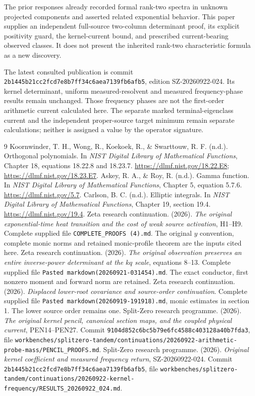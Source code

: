 \documentclass[10pt]{article}
\begin{document}
The prior responses already recorded formal rank-two spectra in unknown projected components and asserted related exponential behavior. This paper supplies an independent full-source two-column determinant proof, its explicit positivity guard, the kernel-current bound, and prescribed current-bearing observed classes. It does not present the inherited rank-two characteristic formula as a new discovery.

The latest consulted publication is commit \nolinkurl{2b1445b21cc2fcd7e8b7ff34c6aea7139fb6afb5}, edition SZ-20260922-024. Its kernel determinant, uniform measured-resolvent and measured frequency-phase results remain unchanged. Those frequency phases are not the first-order arithmetic current calculated here. The separate marked terminal-eigenclass current and the independent proper-source target minimum remain separate calculations; neither is assigned a value by the operator signature.

\begin{thebibliography}{9}
 Koornwinder, T. H., Wong, R., Koekoek, R., \& Swarttouw, R. F. (n.d.). Orthogonal polynomials. In \emph{NIST Digital Library of Mathematical Functions}, Chapter 18, equations 18.22.8 and 18.23.7. \url{https://dlmf.nist.gov/18.22.E8}; \url{https://dlmf.nist.gov/18.23.E7}.
 Askey, R. A., \& Roy, R. (n.d.). Gamma function. In \emph{NIST Digital Library of Mathematical Functions}, Chapter 5, equation 5.7.6. \url{https://dlmf.nist.gov/5.7}.
 Carlson, B. C. (n.d.). Elliptic integrals. In \emph{NIST Digital Library of Mathematical Functions}, Chapter 19, section 19.4. \url{https://dlmf.nist.gov/19.4}.
 Zeta research continuation. (2026). \emph{The original exponential-time heat transition and the cost of weak source activation}, H1--H9. Complete supplied file \nolinkurl{COMPLETE_PROOFS (4).md}. The original $y$ convention, complete monic norms and retained monic-profile theorem are the inputs cited here.
 Zeta research continuation. (2026). \emph{The original observation preserves an entire inverse-power determinant at the $kq$ scale}, equations 8--13. Complete supplied file \nolinkurl{Pasted markdown(20260921-031454).md}. The exact conductor, first nonzero moment and forward norm are retained.
 Zeta research continuation. (2026). \emph{Displaced lower-root covariance and source-order continuation}. Complete supplied file \nolinkurl{Pasted markdown(20260919-191918).md}, monic estimates in section 1. The lower source order remains one.
 Split-Zero research programme. (2026). \emph{The original kernel pencil, canonical section maps, and the coupled physical current}, PEN14--PEN27. Commit \nolinkurl{9104d852c6bc5b79e6fc4588c403128a40b7fda3}, file \nolinkurl{workbenches/splitzero-tandem/continuations/20260922-arithmetic-probe-mass/PENCIL_PROOFS.md}.
 Split-Zero research programme. (2026). \emph{Original kernel coefficient and measured frequency return}, SZ-20260922-024. Commit \nolinkurl{2b1445b21cc2fcd7e8b7ff34c6aea7139fb6afb5}, file \nolinkurl{workbenches/splitzero-tandem/continuations/20260922-kernel-frequency/RESULTS_20260922_024.md}.
\end{thebibliography}
\end{document}
